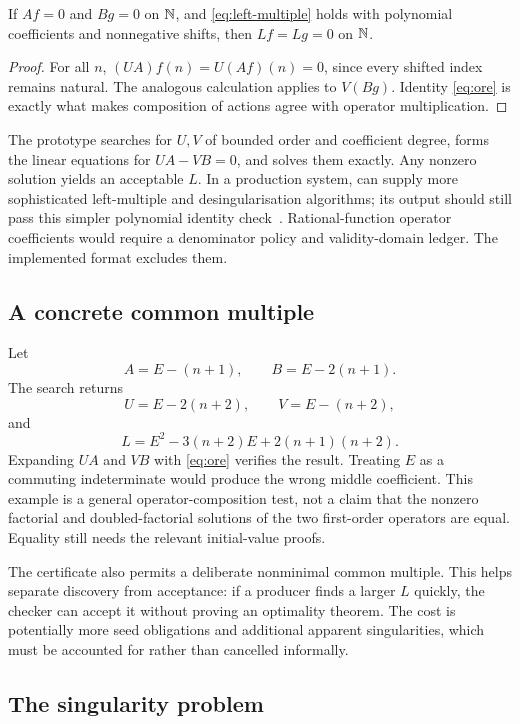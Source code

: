 \begin{proposition}
If $Af=0$ and $Bg=0$ on $\mathbb N$, and \eqref{eq:left-multiple} holds with polynomial
coefficients and nonnegative shifts, then $Lf=Lg=0$ on $\mathbb N$.
\end{proposition}
\begin{proof}
For all $n$, $(UA)f(n)=U(Af)(n)=0$, since every shifted index remains natural.
The analogous calculation applies to $V(Bg)$. Identity \eqref{eq:ore} is exactly
what makes composition of actions agree with operator multiplication.
\end{proof}

The prototype searches for $U,V$ of bounded order and coefficient degree,
forms the linear equations for $UA-VB=0$, and solves them exactly. Any nonzero
solution yields an acceptable $L$. In a production system, 
can supply more sophisticated left-multiple and desingularisation algorithms;
its output should still pass this simpler polynomial identity check~\cite{ore,ore-paper}.
Rational-function operator coefficients would require a denominator policy and
validity-domain ledger. The implemented format excludes them.

\subsection{A concrete common multiple}

Let
\[
A=E-(n+1),\qquad B=E-2(n+1).
\]
The search returns
\[
U=E-2(n+2),\qquad V=E-(n+2),
\]
and
\[
L=E^2-3(n+2)E+2(n+1)(n+2).
\]
Expanding $UA$ and $VB$ with \eqref{eq:ore} verifies the result. Treating $E$
as a commuting indeterminate would produce the wrong middle coefficient.
This example is a general operator-composition test, not a claim that the
nonzero factorial and doubled-factorial solutions of the two first-order
operators are equal. Equality still needs the relevant initial-value proofs.

The certificate also permits a deliberate nonminimal common multiple. This
helps separate discovery from acceptance: if a producer finds a larger $L$
quickly, the checker can accept it without proving an optimality theorem.
The cost is potentially more seed obligations and additional apparent
singularities, which must be accounted for rather than cancelled informally.

\subsection{The singularity problem}

